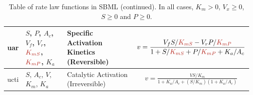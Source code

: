 \documentclass[10pt]{cekarticle}
\newcommand{\changed}[1]{\textcolor{BrickRed}{#1}}
\newenvironment{blockChanged}{\color{BrickRed}}{}
\begin{document}
\begin{table}[ht]
\begin{tabular}{|p{0.5in}|>{\raggedright}m{0.77in}|>{\raggedright}m{1.5in}|m{3in}|}
uar & $S$, $P$, $A_c$, $V_f$, $V_r$, $\changed{K_{mS}}$, $\changed{K_{mP}}$, $K_a$ & Specific
Activation Kinetics (Reversible) &
\begin{gather*}
v = \frac{V_f S/\changed{K_{mS}} - V_r P/\changed{K_{mP}}}{1 + S/\changed{K_{mS}} + P/\changed{K_{mP}} + K_a/A_c}
\end{gather*}
\\ \hline

ucti & $S$, $A_c$, $V$, $K_m$, $K_a$ & Catalytic Activation
(Irreversible) &
\begin{blockChanged}
\begin{gather*}
v = \frac{V S/K_m}{1 + K_a/A_c + \left( S/K_m \right) \left( 1 + K_a/A_c\right)}
\end{gather*}
\end{blockChanged}
\\ \hline

\end{tabular}
\caption{Table of rate law functions in SBML (continued).  In all cases, $K_m > 0$, $V_x \geq 0$, $S
  \geq 0$ and $P \geq 0$.}
\end{table}
\end{document}

